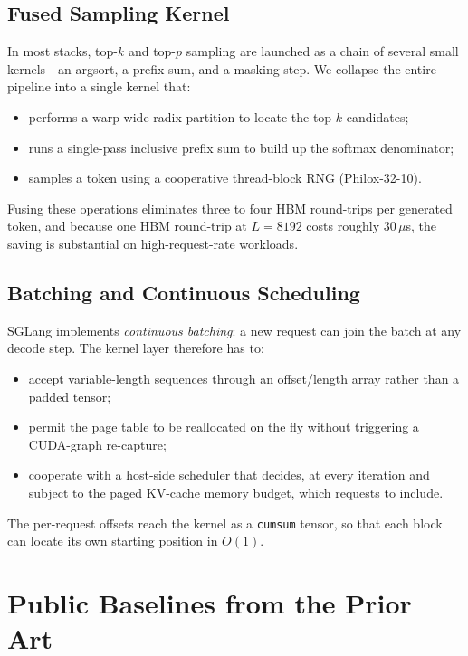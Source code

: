 \subsection{Fused Sampling Kernel}\label{sec:sglang_sampling}
In most stacks, top-$k$ and top-$p$ sampling are launched as a
chain of several small kernels---an argsort, a prefix sum, and a
masking step. We collapse the entire pipeline into a single
kernel that:
\begin{itemize}
    \item performs a warp-wide radix partition to locate the
          top-$k$ candidates;
    \item runs a single-pass inclusive prefix sum to build up the
          softmax denominator;
    \item samples a token using a cooperative thread-block RNG
          (Philox-32-10).
\end{itemize}
Fusing these operations eliminates three to four HBM round-trips
per generated token, and because one HBM round-trip at $L = 8192$
costs roughly $30\,\mu$s, the saving is substantial on
high-request-rate workloads.

\subsection{Batching and Continuous Scheduling}\label{sec:sglang_sched}
SGLang implements \emph{continuous batching}: a new request can
join the batch at any decode step. The kernel layer therefore has
to:
\begin{itemize}
    \item accept variable-length sequences through an
          offset/length array rather than a padded tensor;
    \item permit the page table to be reallocated on the fly
          without triggering a CUDA-graph re-capture;
    \item cooperate with a host-side scheduler that decides, at
          every iteration and subject to the paged KV-cache
          memory budget, which requests to include.
\end{itemize}
The per-request offsets reach the kernel as a \texttt{cumsum}
tensor, so that each block can locate its own starting position
in $O(1)$.

\section{Public Baselines from the Prior Art}\label{sec:sglang_public_baselines}

